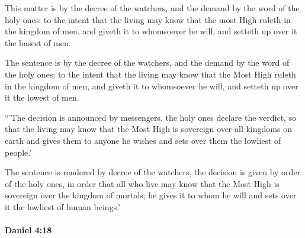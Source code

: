 			This matter is by the decree of the watchers, and the demand by the word of the holy ones: to the intent that the living may know that the most High ruleth in the kingdom of men, and giveth it to whomsoever he will, and setteth up over it the basest of men.

			\begin{versebox}
					\item[BHS] 
					\item[LXX] 
					\item[ASV] The sentence is by the decree of the watchers, and the demand by the word of the holy ones; to the intent that the living may know that the Most High ruleth in the kingdom of men, and giveth it to whomsoever he will, and setteth up over it the lowest of men.
					\item[NIV] “’The decision is announced by messengers, the holy ones declare the verdict, so that the living may know that the Most High is sovereign over all kingdoms on earth and gives them to anyone he wishes and sets over them the lowliest of people.’
					\item[NRSV] The sentence is rendered by decree of the watchers, the decision is given by order of the holy ones, in order that all who live may know that the Most High is sovereign over the kingdom of mortals; he gives it to whom he will and sets over it the lowliest of human beings.’
			\end{versebox}

		\paragraph{Daniel 4:18} %
			\label{DANIEL-4-18}

